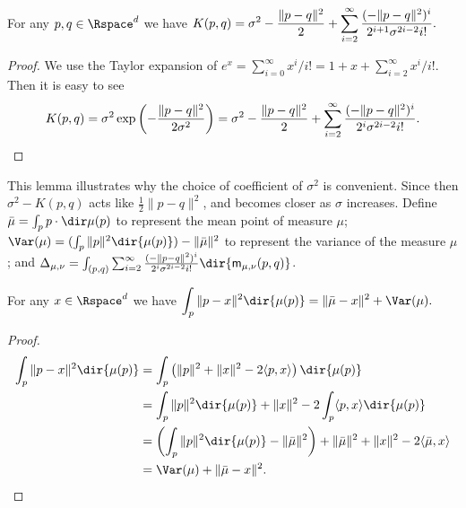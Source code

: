 \documentclass[11pt]{myclass}
\begin{document}
\begin{lemma}
For any $p,q \in \Rspace^d$ we have
$\begin{displaystyle}
K(p,q) 
=
\sigma^2 - \frac{\|p-q\|^2}{2} + \sum_{i=2}^\infty \frac{(-\|p-q\|^2)^i}{2^{i+1} \sigma^{2i-2} i!}. 
\end{displaystyle}$
\label{lem:Kflip}
\end{lemma}
\begin{proof}
We use the Taylor expansion of $e^x = \sum_{i=0}^\infty x^i/i! = 1 + x + \sum_{i=2}^\infty x^i /i!$.
Then it is easy to see
\[
K(p,q) 
= 
\sigma^2 \exp \left(-\frac{\|p-q\|^2}{2 \sigma^2} \right) 
=
\sigma^2 - \frac{\|p-q\|^2}{2} + \sum_{i=2}^\infty \frac{(-\|p-q\|^2)^i}{2^i \sigma^{2i-2} i!}. \qedhere
\]
\end{proof}

This lemma illustrates why the choice of coefficient of $\sigma^2$ is convenient.  Since then $\sigma^2 - K(p,q)$ acts like $\frac{1}{2}\|p-q\|^2$, and becomes closer as $\sigma$ increases.  
Define $\bar \mu = \int_p p \cdot  \dir \mu(p)$ to represent the mean point of measure $\mu$;
$\Var(\mu) = (\int_p \|p\|^2 \dir{\mu(p)}) - \|\bar \mu\|^2$  to represent the variance of the measure $\mu$; and  
$\Delta_{\mu,\nu} = \int_{(p,q)} \sum_{i=2}^\infty \frac{(-\|p-q\|^2)^i}{2^i \sigma^{2i-2} i!} \dir{\textsf{m}_{\mu,\nu}(p,q)}$.

\begin{lemma}
For any $x \in \Rspace^d$ we have
$\begin{displaystyle}
\int_p \|p - x\|^2 \dir{\mu(p)} = \|\bar \mu - x\|^2 + \Var(\mu).
\end{displaystyle}$
\label{lem:mean+Var}
\end{lemma}
\begin{proof} 
\begin{align*}
\int_p \|p - x\|^2 \dir{\mu(p)}
&= 
\int_p \left( \|p\|^2 + \|x\|^2 - 2 \langle p , x \rangle \right) \dir{\mu(p)}
\\ &=
\int_p \|p\|^2 \dir{\mu(p)} + \|x\|^2 - 2 \int_p \langle p , x \rangle \dir{\mu(p)}
\\ &=
\left(\int_p \|p\|^2 \dir{\mu(p)} - \|\bar \mu\|^2\right) + \|\bar \mu\|^2 + \|x\|^2 - 2 \langle \bar \mu , x \rangle
\\ &=
\Var(\mu) + \|\bar \mu - x\|^2.  \qedhere
\end{align*}
\end{proof}
\end{document}
